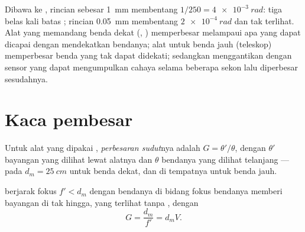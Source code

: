 \begin{remark}\label{rem:b1:optical-instruments:purpose}
Dibawa ke , rincian sebesar \qty{1}{mm} membentang $1/250 =
\qty{4e-3}{rad}$: tiga belas kali batas ; rincian
\qty{0.05}{mm} membentang $\qty{2e-4}{rad}$ dan tak terlihat. Alat yang
memandang benda dekat (, ) memperbesar  melampaui apa yang dapat dicapai dengan mendekatkan bendanya;
alat untuk benda jauh (teleskop) memperbesar  benda yang
tak dapat didekati; sedangkan  menggantikan  dengan sensor
yang dapat mengumpulkan cahaya selama beberapa sekon lalu diperbesar
sesudahnya.
\end{remark}

\section{Kaca pembesar}

\begin{definition}\label{def:b1:optical-instruments:G}
Untuk alat yang dipakai , \emph{perbesaran sudut}nya adalah
$G = \theta'/\theta$, dengan $\theta'$  bayangan yang
dilihat lewat alatnya dan $\theta$  bendanya yang dilihat
 telanjang --- pada  $d_m = \qty{25}{cm}$ untuk benda
dekat, dan di tempatnya untuk benda jauh.
\end{definition}

\begin{proposition}\label{prop:b1:optical-instruments:loupe}
 berjarak fokus $f' < d_m$ dengan bendanya di bidang
fokus bendanya memberi bayangan di tak hingga, yang terlihat tanpa
, dengan
\[
G = \frac{d_m}{f'} = d_m V .
\]
\end{proposition}

